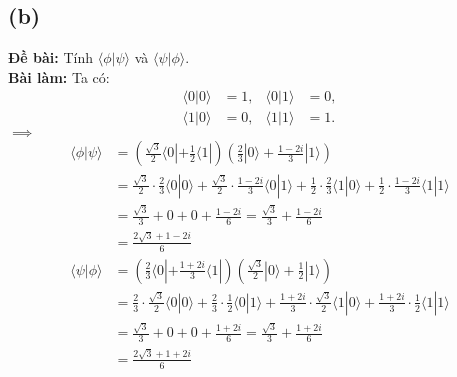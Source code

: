 \subsection{(b)}
\textbf{Đề bài:} Tính $\langle\phi|\psi\rangle$ và $\langle\psi|\phi\rangle$.\\
\textbf{Bài làm:}
Ta có:
\begin{align*}
    \langle0|0\rangle & = 1, & \langle0|1\rangle & = 0, \\
    \langle1|0\rangle & = 0, & \langle1|1\rangle & = 1.
\end{align*}
$\implies$
\begin{align*}
    \langle\phi|\psi\rangle & = \left(\frac{\sqrt{3}}{2}\langle0|+\frac{1}{2}\langle1|\right)\left(\frac{2}{3}|0\rangle+\frac{1-2i}{3}|1\rangle\right)                                                                                        \\
                            & = \frac{\sqrt{3}}{2}\cdot\frac{2}{3}\langle0|0\rangle + \frac{\sqrt{3}}{2}\cdot\frac{1-2i}{3}\langle0|1\rangle + \frac{1}{2}\cdot\frac{2}{3}\langle1|0\rangle + \frac{1}{2}\cdot\frac{1-2i}{3}\langle1|1\rangle \\
                            & = \frac{\sqrt{3}}{3} + 0 + 0 + \frac{1-2i}{6} = \frac{\sqrt{3}}{3} + \frac{1-2i}{6}                                                                                                                             \\
                            & = \frac{2\sqrt{3} + 1 - 2i}{6}
\end{align*}
\begin{align*}
    \langle\psi|\phi\rangle & = \left(\frac{2}{3}\langle0|+\frac{1+2i}{3}\langle1|\right)\left(\frac{\sqrt{3}}{2}|0\rangle+\frac{1}{2}|1\rangle\right)                                                                                        \\
                            & = \frac{2}{3}\cdot\frac{\sqrt{3}}{2}\langle0|0\rangle + \frac{2}{3}\cdot\frac{1}{2}\langle0|1\rangle + \frac{1+2i}{3}\cdot\frac{\sqrt{3}}{2}\langle1|0\rangle + \frac{1+2i}{3}\cdot\frac{1}{2}\langle1|1\rangle \\
                            & = \frac{\sqrt{3}}{3} + 0 + 0 + \frac{1+2i}{6} = \frac{\sqrt{3}}{3} + \frac{1+2i}{6}                                                                                                                             \\
                            & = \frac{2\sqrt{3} + 1 + 2i}{6}
\end{align*}

